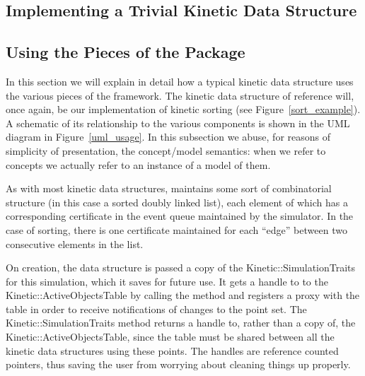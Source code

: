 
\subsection{Implementing a Trivial Kinetic Data Structure}
\label{sec:trivial_kds_example}

\subsection{Using the Pieces of the Package}

In this section we will explain in detail how a typical kinetic data
structure uses the various pieces of the framework. The kinetic data
structure of reference will, once again, be our implementation of
kinetic sorting (see Figure~\ref{sort_example}).  A schematic of its
relationship to the various components is shown in the UML diagram in
Figure~\ref{uml_usage}. In this subsection we abuse, for reasons of
simplicity of presentation, the concept/model semantics: when we refer
to concepts we actually refer to an instance of a model of them.

As with most kinetic data structures,  maintains
some sort of combinatorial structure (in this case a sorted doubly linked list),
each element of which has a corresponding certificate in the event queue
maintained by the simulator. In the case of sorting, there is one
certificate maintained for each ``edge'' between two consecutive
elements in the list.

On creation, the data structure is passed a copy of the
Kinetic::SimulationTraits for this simulation, which it saves for
future use. It gets a handle to to the Kinetic::ActiveObjectsTable by
calling the
 method
and registers a proxy with the table in order to receive notifications
of changes to the point set.  The Kinetic::SimulationTraits method
returns a handle to, rather than a copy of, the
Kinetic::ActiveObjectsTable, since the table must be shared between
all the kinetic data structures using these points.  The handles are
reference counted pointers, thus saving the user from worrying about
cleaning things up properly.

